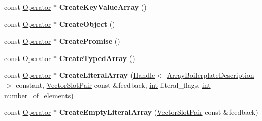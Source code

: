 \begin{DoxyCompactItemize}
\mbox{\label{classv8_1_1internal_1_1compiler_1_1JSOperatorBuilder_a0dacf3532da194872f0b85949ab9faa7}} 
const \mbox{\hyperlink{classv8_1_1internal_1_1compiler_1_1Operator}{Operator}} $\ast$ {\bfseries Create\+Key\+Value\+Array} ()
\item 
\mbox{\label{classv8_1_1internal_1_1compiler_1_1JSOperatorBuilder_ad016f2a31a3676c07669d5eb2342db35}} 
const \mbox{\hyperlink{classv8_1_1internal_1_1compiler_1_1Operator}{Operator}} $\ast$ {\bfseries Create\+Object} ()
\item 
\mbox{\label{classv8_1_1internal_1_1compiler_1_1JSOperatorBuilder_a24449d2b9d7f855b70afb37345e7e8df}} 
const \mbox{\hyperlink{classv8_1_1internal_1_1compiler_1_1Operator}{Operator}} $\ast$ {\bfseries Create\+Promise} ()
\item 
\mbox{\label{classv8_1_1internal_1_1compiler_1_1JSOperatorBuilder_a52034072de15427e28bdf2d82f22a42a}} 
const \mbox{\hyperlink{classv8_1_1internal_1_1compiler_1_1Operator}{Operator}} $\ast$ {\bfseries Create\+Typed\+Array} ()
\item 
\mbox{\label{classv8_1_1internal_1_1compiler_1_1JSOperatorBuilder_aeceec02cd2acd703ed9a5f2bf4bc7b57}} 
const \mbox{\hyperlink{classv8_1_1internal_1_1compiler_1_1Operator}{Operator}} $\ast$ {\bfseries Create\+Literal\+Array} (\mbox{\hyperlink{classv8_1_1internal_1_1Handle}{Handle}}$<$ \mbox{\hyperlink{classv8_1_1internal_1_1ArrayBoilerplateDescription}{Array\+Boilerplate\+Description}} $>$ constant, \mbox{\hyperlink{classv8_1_1internal_1_1VectorSlotPair}{Vector\+Slot\+Pair}} const \&feedback, \mbox{\hyperlink{classint}{int}} literal\+\_\+flags, \mbox{\hyperlink{classint}{int}} number\+\_\+of\+\_\+elements)
\item 
\mbox{\label{classv8_1_1internal_1_1compiler_1_1JSOperatorBuilder_aa2b80c69230cbce56a1178c4469aa017}} 
const \mbox{\hyperlink{classv8_1_1internal_1_1compiler_1_1Operator}{Operator}} $\ast$ {\bfseries Create\+Empty\+Literal\+Array} (\mbox{\hyperlink{classv8_1_1internal_1_1VectorSlotPair}{Vector\+Slot\+Pair}} const \&feedback)

\end{DoxyCompactItemize}
